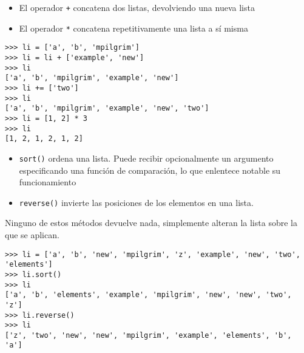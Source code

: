 \begin{frame}[fragile]

\begin{itemize}
\item El operador \verb|+| concatena dos listas, devolviendo una nueva
  lista
\item El operador \verb|*| concatena repetitivamente una lista a sí
  misma
\end{itemize}

\begin{footnotesize}
\begin{verbatim}
>>> li = ['a', 'b', 'mpilgrim']
>>> li = li + ['example', 'new'] 
>>> li
['a', 'b', 'mpilgrim', 'example', 'new']
>>> li += ['two']                
>>> li
['a', 'b', 'mpilgrim', 'example', 'new', 'two']
>>> li = [1, 2] * 3              
>>> li
[1, 2, 1, 2, 1, 2]
\end{verbatim}
\end{footnotesize}



\end{frame}



\begin{frame}[fragile]

\begin{itemize}
\item \verb|sort()| ordena una lista. Puede recibir opcionalmente un
  argumento especificando una función de comparación, lo que enlentece
  notable su funcionamiento
\item \verb|reverse()| invierte las posiciones de los elementos en una
  lista.
\end{itemize}
Ninguno de estos métodos devuelve nada, simplemente alteran la lista
sobre la que se aplican.
\begin{footnotesize}
\begin{verbatim}
>>> li = ['a', 'b', 'new', 'mpilgrim', 'z', 'example', 'new', 'two', 'elements']
>>> li.sort() 
>>> li
['a', 'b', 'elements', 'example', 'mpilgrim', 'new', 'new', 'two', 'z']
>>> li.reverse()
>>> li
['z', 'two', 'new', 'new', 'mpilgrim', 'example', 'elements', 'b', 'a']
\end{verbatim}
\end{footnotesize}

\end{frame}







